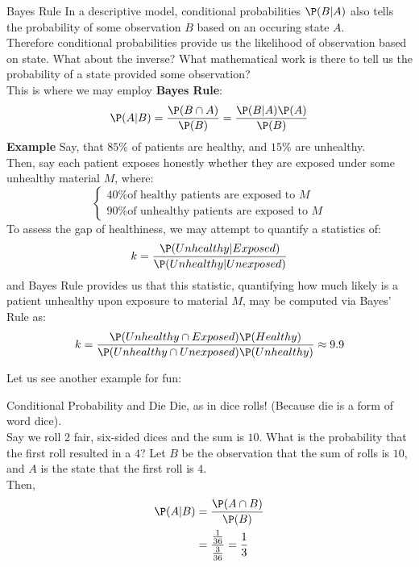 \begin{ln-define}{Bayes Rule}{}
    In a descriptive model, conditional probabilities $\P(B|A)$ also tells the probability of some observation $B$ based on an occuring state $A$. \\
    Therefore conditional probabilities provide us the likelihood of observation based on state. What about the inverse? What mathematical work is there to tell us the probability of a state provided some observation? \\
    This is where we may employ \textbf{Bayes Rule}: 
    \[\P(A|B) = \frac{\P(B \cap A)}{\P(B)} = \frac{\P(B|A) \P(A)}{\P(B)}\]
    \tcblower
    \textbf{Example} Say, that $85\%$ of patients are healthy, and $15\%$ are unhealthy. \\
    Then, say each patient exposes honestly whether they are exposed under some unhealthy material $M$, where:
    \[
        \begin{cases}
            40\% \text{of healthy patients are exposed to } M \\
            90\% \text{of unhealthy patients are exposed to } M
        \end{cases}
    \]
    To assess the gap of healthiness, we may attempt to quantify a statistics of:
    \[k = \frac{\P(Unhealthy | Exposed)}{\P(Unhealthy | Unexposed)}\]
    and Bayes Rule provides us that this statistic, quantifying how much likely is a patient unhealthy upon exposure to material $M$, may be computed via Bayes' Rule as:
    \[
        k = \frac{\P(Unhealthy \cap Exposed) \P(Healthy)}{\P(Unhealthy \cap Unexposed) \P(Unhealthy)} \approx 9.9
    \]
\end{ln-define}

Let us see another example for fun:
\begin{ln-explain}{Conditional Probability and Die}{}
    Die, as in dice rolls! (Because die is a form of word dice). \\
    Say we roll 2 fair, six-sided dices and the sum is $10$. What is the probability that the first roll resulted in a $4$?
    \tcblower
    Let $B$ be the observation that the sum of rolls is $10$, and $A$ is the state that the first roll is $4$. \\
    Then, 
    \begin{align*}
        \P(A | B) &= \frac{\P(A \cap B)}{\P(B)} \\
        &= \frac{\frac{1}{36}}{\frac{3}{36}} = \frac{1}{3}
    \end{align*}
\end{ln-explain}

